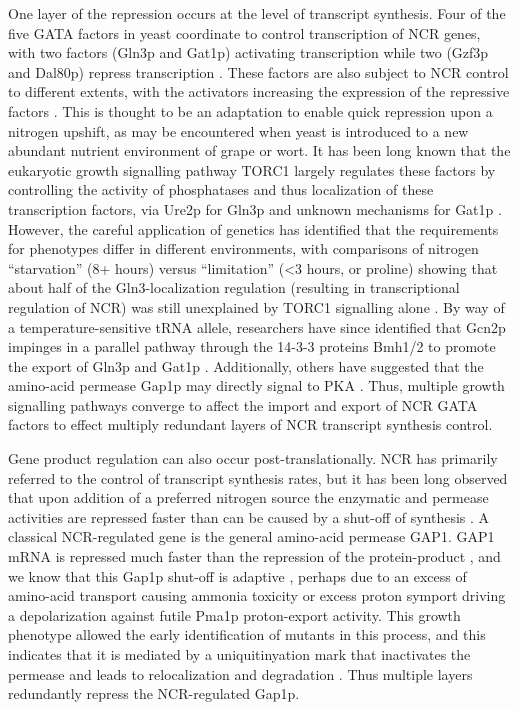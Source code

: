 One layer of
the repression occurs at the level of transcript synthesis. Four of
the five GATA factors in yeast coordinate to control transcription of
NCR genes, with two factors (Gln3p and Gat1p) activating transcription
while two (Gzf3p and Dal80p) repress transcription 
\parencite{hahn2011transcriptional,stanbrough1995transcriptional,daugherty1993regulatory,scherens2006identification}. 
These factors are also subject to NCR
control to different extents, with the activators increasing the
expression of the repressive factors 
\parencite{cunningham2000nitrogen}. 
This is thought to be an
adaptation to enable quick repression upon a nitrogen upshift, as may
be encountered when yeast is introduced to a new abundant nutrient
environment of grape or wort. It has been long known that the
eukaryotic growth signalling pathway TORC1 largely regulates these
factors by controlling the activity of phosphatases and thus
localization of these transcription factors, via Ure2p for Gln3p 
\parencite{beck1999tor,cox2000saccharomyces} 
and unknown mechanisms for Gat1p
\parencite{georis2008tor}. 
However, the careful application of genetics has identified that the
requirements for phenotypes differ in different environments, with
comparisons of nitrogen “starvation” (8+ hours) versus “limitation”
(<3 hours, or proline) showing that about half of the
Gln3-localization regulation (resulting in transcriptional regulation
of NCR) was still unexplained by TORC1 signalling alone
\parencite{tate2013five}. By way
of a temperature-sensitive tRNA allele, researchers have since identified
that Gcn2p impinges in a parallel pathway through the 14-3-3 proteins
Bmh1/2 to promote the export of Gln3p and Gat1p 
\parencite{tate2015gata,tate2017general}. 
Additionally, others have suggested that the
amino-acid permease Gap1p may directly signal to PKA
\parencite{donaton2003gap1,van2009transport}.
Thus, multiple growth signalling pathways converge to
affect the import and export of NCR GATA factors to effect multiply
redundant layers of NCR transcript synthesis control.  

Gene product
regulation can also occur post-translationally. NCR has primarily
referred to the control of transcript synthesis rates, but it has been
long observed that upon addition of a preferred nitrogen source the
enzymatic and permease activities are repressed faster than can be
caused by a shut-off of synthesis 
\parencite{cooper1983function}. A
classical NCR-regulated gene is the general amino-acid permease GAP1.
GAP1 mRNA is repressed much faster than the repression of the
protein-product 
\parencite{stanbrough1995transcriptional}, and we know that this
Gap1p shut-off is adaptive \parencite{risinger2006activity}, 
perhaps due to an
excess of amino-acid transport causing ammonia toxicity 
\parencite{hess2006ammonium}
or excess proton symport driving a depolarization against futile
Pma1p proton-export activity. This growth phenotype allowed the early
identification of mutants in this process, and this indicates that it
is mediated by a uniquitinyation mark that inactivates the permease
and leads to relocalization and degradation 
\parencite{grenson1983inactivation,risinger2008different,merhi2012internal}. 
Thus multiple layers redundantly repress the NCR-regulated Gap1p.  

